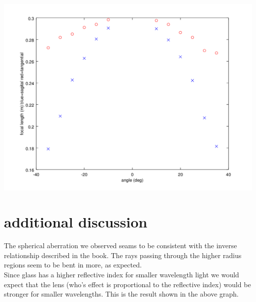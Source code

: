 \documentclass[12pt,a4paper]{article}
\begin{document}
\includegraphics[scale=.7]{sandt}\\
\section{additional discussion}
The spherical aberration we observed seams to be consistent with the inverse relationship described in the book.  The rays passing through the higher radius regions seem to be bent in more, as expected.\\

Since glass has a higher reflective index for smaller wavelength light we would expect that the lens (who's effect is proportional to the reflective index) would be stronger for smaller wavelengths.  This is the result shown in the above graph.\\
\end{document}

